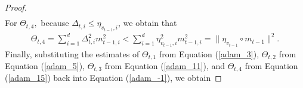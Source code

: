 \documentclass{article} %
\begin{document}
\begin{proof}
{\begin{align}
\end{align}}
For $\Theta_{t,4},$ because $\Delta_{t,i}\le \eta_{v_{t-1},i}$, we obtain that
\begin{align}\label{adam_15}
\Theta_{t,4}=\sum_{i=1}^{d}\Delta_{t,i}^{2}m_{t-1,i}^{2}<\sum_{i=1}^{d}\eta^{2}_{v_{t-1},i}m_{t-1,i}^{2}=\|\eta_{v_{t-1}}\circ m_{t-1}\|^{2}.
\end{align}
Finally, substituting the estimates of $\Theta_{t,1}$ from Equation (\ref{adam_3}), $\Theta_{t,2}$ from Equation (\ref{adam_5}), $\Theta_{t,3}$ from Equation (\ref{adam_11}), and $\Theta_{t,4}$ from Equation (\ref{adam_15}) back into Equation (\ref{adam_-1}), we obtain

\end{proof}
\end{document}
